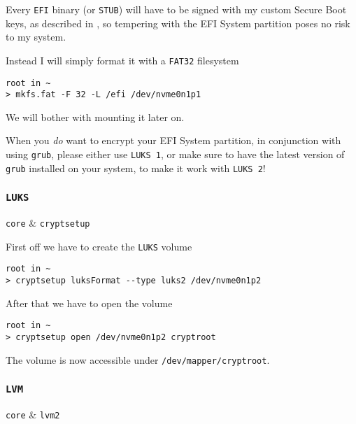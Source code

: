 \documentclass[10pt]{dustdoc}
\begin{document}
Every \texttt{EFI} binary (or \texttt{STUB}) will have to be signed with my custom Secure Boot keys, as described in , so tempering with the EFI System partition poses no risk to my system.

Instead I will simply format it with a \texttt{FAT32} filesystem

\begin{verbatim}
root in ~
> mkfs.fat -F 32 -L /efi /dev/nvme0n1p1
\end{verbatim}

We will bother with mounting it later on.

\begin{NOTE}
    When you \emph{do} want to encrypt your EFI System partition, in conjunction with using \texttt{grub}, please either use \texttt{LUKS 1}, or make sure to have the latest version of \texttt{grub} installed on your system, to make it work with \texttt{LUKS 2}!
\end{NOTE}

\subsubsection{\texttt{LUKS}}%
\label{sec:luks}

\begin{pkgtable}
    \texttt{core} & \texttt{cryptsetup} \\
\end{pkgtable}

First off we have to create the \texttt{LUKS} volume

\begin{verbatim}
root in ~
> cryptsetup luksFormat --type luks2 /dev/nvme0n1p2
\end{verbatim}

After that we have to open the volume

\begin{verbatim}
root in ~
> cryptsetup open /dev/nvme0n1p2 cryptroot
\end{verbatim}

The volume is now accessible under \texttt{/dev/mapper/cryptroot}.

\subsubsection{\texttt{LVM}}%
\label{sec:lvm}

\begin{pkgtable}
    \texttt{core} & \texttt{lvm2} \\
\end{pkgtable}
\end{document}

